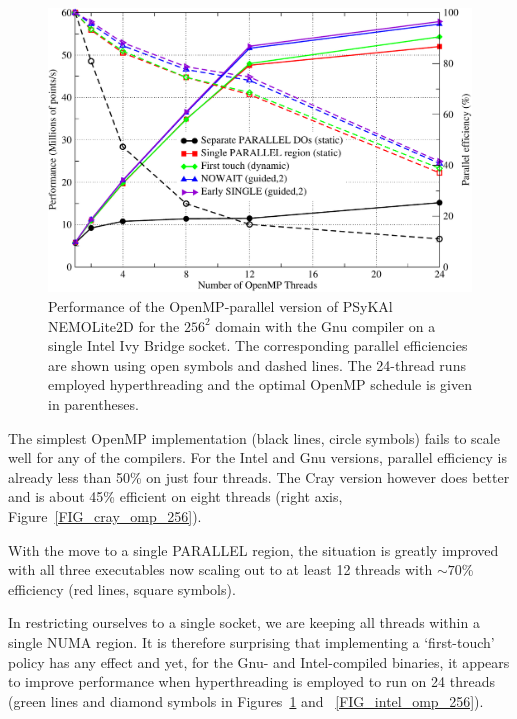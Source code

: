 \documentclass[gmd, manuscript]{copernicus}
\newlength{\picwidth}
\begin{document}
\begin{figure}
\centering
\includegraphics[width=\picwidth]{omp_scaling_256_gnu}
\caption{Performance of the OpenMP-parallel version of
  {PS}y{KA}l NEMOLite2D for the $256^2$ domain with the Gnu compiler on
  a single Intel Ivy Bridge socket. The corresponding parallel
  efficiencies are shown using open symbols and dashed lines. The
  24-thread runs employed hyperthreading and the optimal OpenMP
  schedule is given in parentheses.}
\label{FIG_gnu_omp_256}
\end{figure}

The simplest OpenMP implementation (black lines, circle symbols) fails
to scale well for any of the compilers. For the Intel and Gnu
versions, parallel efficiency is already less than 50\% on just four
threads. The Cray version however does better and is about 45\%
efficient on eight threads (right axis, Figure~\ref{FIG_cray_omp_256}).

With the move to a single PARALLEL region, the situation
is greatly improved with all three executables now scaling out to at
least 12 threads with $\sim70$\% efficiency (red lines, square symbols).

In restricting ourselves to a single socket, we are keeping all
threads within a single NUMA region. It is therefore surprising that
implementing a `first-touch' policy has any effect and yet, for the
Gnu- and Intel-compiled binaries, it appears to improve performance
when hyperthreading is employed to run on 24 threads (green lines and
diamond symbols in Figures~\ref{FIG_gnu_omp_256} and
~\ref{FIG_intel_omp_256}).
\end{document}
